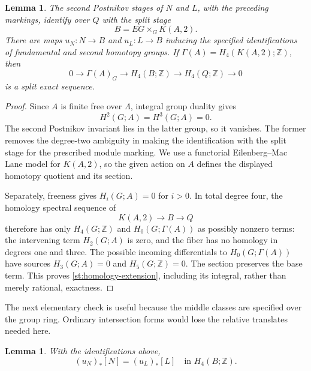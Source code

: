 \documentclass[11pt]{article}
\newtheorem{lemma}[theorem]{Lemma}
\theoremstyle{definition}
\theoremstyle{remark}
\newcommand{\Z}{\mathbb Z}
\begin{document}
\begin{lemma}\label{st:second-stage}
The second Postnikov stages of $N$ and $L$, with the preceding markings,
identify over $Q$ with the split stage
\[
 B=EG\times_G K(A,2).
\]
There are maps $u_N\colon N\to B$ and $u_L\colon L\to B$ inducing the
specified identifications of fundamental and second homotopy groups.
If $\Gamma(A)=H_4(K(A,2);\Z)$, then
\begin{equation}\label{st:homology-extension}
 0\longrightarrow\Gamma(A)_G\longrightarrow H_4(B;\Z)
 \longrightarrow H_4(Q;\Z)\longrightarrow0
\end{equation}
is a split exact sequence.
\end{lemma}

\begin{proof}
Since $A$ is finite free over $\Lambda$, integral group duality gives
\begin{equation}\label{st:cohomology-vanishing}
 H^2(G;A)=H^3(G;A)=0.
\end{equation}
The second Postnikov invariant lies in the latter group, so it vanishes.
The former removes the degree-two ambiguity in making the identification
with the split stage for the prescribed module marking.  We use a
functorial Eilenberg--Mac Lane model for $K(A,2)$, so the given action on
$A$ defines the displayed homotopy quotient and its section.

Separately, freeness gives $H_i(G;A)=0$ for $i>0$.  In total degree four,
the homology spectral sequence of
\[
 K(A,2)\longrightarrow B\longrightarrow Q
\]
therefore has only $H_4(G;\Z)$ and $H_0(G;\Gamma(A))$ as possibly
nonzero terms: the intervening term $H_2(G;A)$ is zero, and the fiber has
no homology in degrees one and three.  The possible incoming
differentials to $H_0(G;\Gamma(A))$ have sources $H_3(G;A)=0$ and
$H_5(G;\Z)=0$.  The section preserves the base term.  This proves
\eqref{st:homology-extension}, including its integral, rather than merely
rational, exactness.
\end{proof}

The next elementary check is useful because the middle classes are
specified over the group ring.  Ordinary intersection forms would lose
the relative translates needed here.

\begin{lemma}\label{st:quadratic-detection}
With the identifications above,
\begin{equation}\label{st:fundamental-equality}
 (u_N)_*[N]=(u_L)_*[L]\quad\text{in }H_4(B;\Z).
\end{equation}
\end{lemma}
\end{document}
